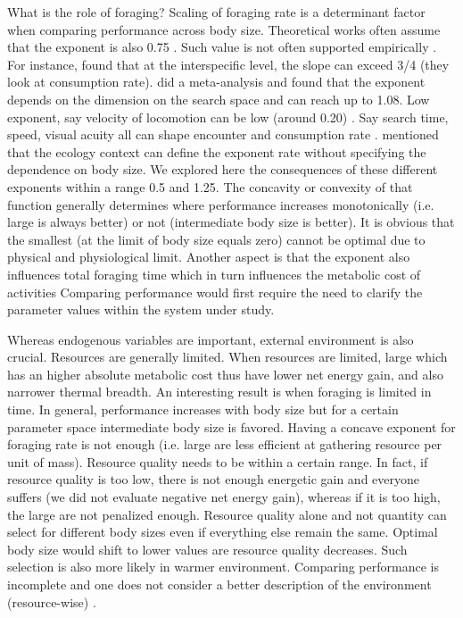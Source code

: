What is the role of foraging?
Scaling of foraging rate is a determinant factor when comparing performance across body size.
Theoretical works often assume that the exponent is also 0.75 \citep{Yodzis1992, Brown1993}.
Such value is not often supported empirically .
For instance, \citet{Maino2015} found that at the interspecific level, the slope can exceed 3/4 (they look at consumption rate).
\citet{Pawar2012} did a meta-analysis and found that the exponent depends on the dimension on the search space and can reach up to 1.08.
Low exponent, say velocity of locomotion can be low (around 0.20)  \citep{Peters1986}.
Say search time, speed, visual acuity all can shape encounter and consumption rate \citep[ref in][]{Kalinkat2015}.
\citet{Yodzis1992} mentioned that the ecology context can define the exponent rate without specifying the dependence on body size.
We explored here the consequences of these different exponents within a range 0.5 and 1.25.
The concavity or convexity of that function generally determines where performance increases monotonically (i.e. large is always better) or not (intermediate body size is better).
It is obvious that the smallest (at the limit of body size equals zero) cannot be optimal due to physical and physiological limit.
Another aspect is that the exponent also influences total foraging time which in turn influences the metabolic cost of activities
Comparing performance would first require the need to clarify the parameter values within the system under study.

Whereas endogenous variables are important, external environment is also crucial.
Resources are generally limited.
When resources are limited, large which has an higher absolute metabolic cost thus have lower net energy gain, and also narrower thermal breadth.
An interesting result is when foraging is limited in time.
In general, performance increases with body size but for a certain parameter space intermediate body size is favored.
Having a concave exponent for foraging rate is not enough (i.e. large are less efficient at gathering resource per unit of mass).
Resource quality needs to be within a certain range.
In fact, if resource quality is too low, there is not enough energetic gain and everyone suffers (we did not evaluate negative net energy gain), whereas if it is too high, the large are not penalized enough.
Resource quality alone and not quantity can select for different body sizes even if everything else remain the same.
Optimal body size would shift to lower values are resource quality decreases.
Such selection is also more likely in warmer environment.
Comparing performance is incomplete and one does not consider a better description of the environment (resource-wise) \citet{Sears2015}.

